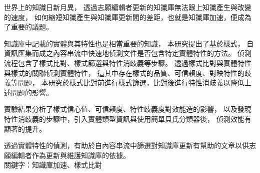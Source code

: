 \begin{abstractzh}

世界上的知識日新月異，
透過志願編輯者更新的知識庫無法跟上知識產生與改變的速度，
如何縮短知識產生與知識庫更新間的差距，也就是知識庫加速，便成為了重要的議題。

知識庫中記載的實體與其特性也是相當重要的知識，
本研究提出了基於樣式，
自資訊匯集而成之內容串流中快速地偵測文件是否包含特定實體特性的方法。
偵測流程包含了樣式比對、樣式篩選與特性消歧義等步驟。
透過樣式比對與實體特性與樣式的關聯偵測實體特性，
這其中存在樣式的品質、可信賴度、對映特性的歧義等問題，
本研究於樣式比對前進行樣式篩選，比對後進行特性消歧義以降低上述問題的影響。

實驗結果分析了樣式信心值、可信賴度、特性歧義度對效能造的影響，
以及發現特性消歧義的步驟中，引入實體類型資訊與使用簡單貝氏分類器後，
偵測效能有顯著的提升。

透過實體特性的偵測，有助於自內容串流中篩選對知識庫更新有幫助的文章以供志願編輯者作為更新與維護知識庫的依據。\\

\noindent
關鍵字：知識庫加速、樣式比對

\end{abstractzh}

\begin{abstracten}
\end{abstracten}

